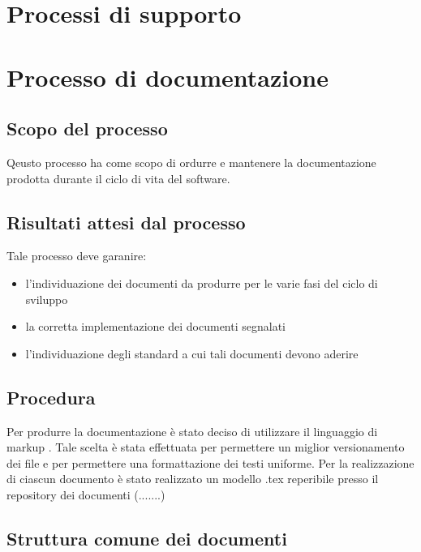 \section{Processi di supporto}
\section{Processo di documentazione}
\subsection{Scopo del processo}
Qeusto processo ha come scopo di ordurre e mantenere la documentazione prodotta durante il ciclo di vita del software.
\subsection{Risultati attesi dal processo}
Tale processo deve garanire:
\begin{itemize}
\item l'individuazione dei documenti da produrre per le varie fasi del ciclo di sviluppo
\item la corretta implementazione dei documenti segnalati
\item l'individuazione degli standard a cui tali documenti devono aderire
\end{itemize}
  \subsection{Procedura}
  Per produrre la documentazione è stato deciso di utilizzare il linguaggio di markup . Tale scelta è stata effettuata per permettere un miglior versionamento dei file e per permettere una formattazione dei testi uniforme.
  Per la realizzazione di ciascun documento \`e stato realizzato un modello .tex reperibile presso il repository dei documenti (.......)

  \subsection{Struttura comune dei documenti}
